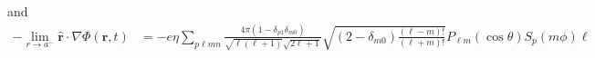 \documentclass{article}
\begin{document}
and
\begin{equation}
\begin{split}
-\lim_{r\to a^-}\hat{\mathbf{r}}\cdot\nabla\Phi(\mathbf{r},t) 
&= -e\eta\sum_{p\ell mn}\frac{4\pi(1 - \delta_{p1}\delta_{m0})}{\sqrt{\ell(\ell + 1)}\sqrt{2\ell + 1}}\sqrt{(2 - \delta_{m0})\frac{(\ell - m)!}{(\ell + m)!}}P_{\ell m}(\cos\theta)S_p(m\phi)\ell\\

\end{split}
\end{equation}
\end{document}
